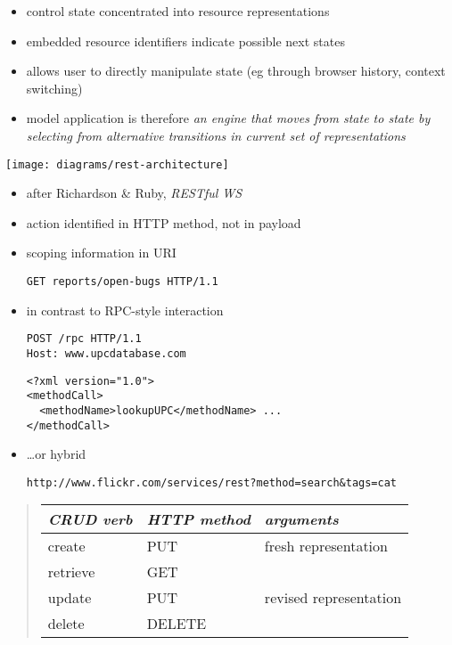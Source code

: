 \documentclass{sepslide-soa-faked} %
\begin{document}
\begin{slide}
\begin{itemize}
\item control state concentrated into resource representations
\item embedded resource identifiers indicate possible next states
\item allows user to directly manipulate state (eg through browser history, context switching)
\item model application is therefore \emph{an engine that moves from state to state by selecting from alternative transitions in current set of representations}
\end{itemize}
\end{slide}

\begin{slide}
\texttt{[image: diagrams/rest-architecture]}
\end{slide}

\begin{slide}
\begin{itemize}
\item after Richardson \& Ruby, \textit{RESTful WS}
\item action identified in HTTP method, not in payload
\item scoping information in URI
\begin{verbatim}
GET reports/open-bugs HTTP/1.1
\end{verbatim}
\item in contrast to RPC-style interaction
\begin{verbatim}
POST /rpc HTTP/1.1
Host: www.upcdatabase.com
\end{verbatim}
\begin{verbatim}
<?xml version="1.0">
<methodCall>
  <methodName>lookupUPC</methodName> ...
</methodCall>
\end{verbatim}
\item \ldots or hybrid
\begin{verbatim}
http://www.flickr.com/services/rest?method=search&tags=cat
\end{verbatim}
\end{itemize}
\end{slide}

\begin{slide}
\begin{quote}
\begin{tabular}{@{}lll@{}}
\textit{CRUD verb} & \textit{HTTP method} & \textit{arguments} \\ \hline
create & PUT & fresh representation \\
retrieve & GET & \\
update & PUT & revised representation \\
delete & DELETE &
\end{tabular}
\end{quote}
\end{slide}
\end{document}
